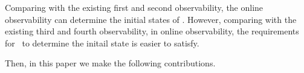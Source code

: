 Comparing with the existing first and second observability, the online observability can determine the initial states of \BCNs. However, comparing with the existing third and fourth observability, in online observability, the requirements for \BCNs\ to determine the initail state is easier to satisfy.  

Then, in this paper we make the following contributions. 

